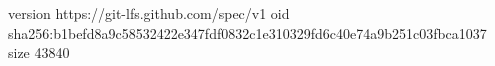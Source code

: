 version https://git-lfs.github.com/spec/v1
oid sha256:b1befd8a9c58532422e347fdf0832c1e310329fd6c40e74a9b251c03fbca1037
size 43840
